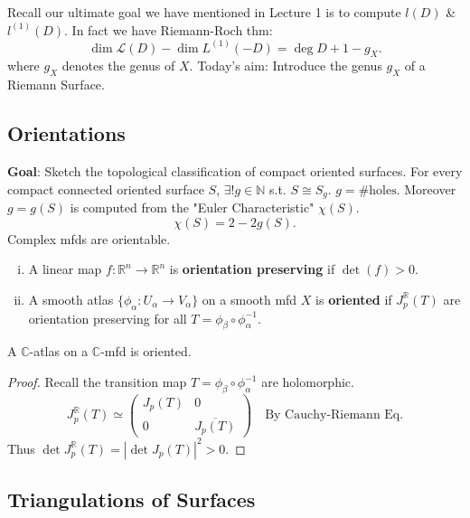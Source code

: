 \documentclass{article}
\begin{document}
Recall our ultimate goal we have mentioned in Lecture 1 is to compute $l(D)$ \& $l^{(1)}(D)$.
In fact we have Riemann-Roch thm:
\[
\dim \mathcal{L}(D) - \dim L^{(1)}(-D) = \deg D + 1 - g_X.
\]
where $g_X$ denotes the genus of $X$.
Today's aim: Introduce the genus $g_X$ of a Riemann Surface.

\subsection{Orientations}

\textbf{Goal}: Sketch the topological classification of compact oriented surfaces. For every compact connected oriented surface $S$, $\exists ! g \in \mathbb{N}$ s.t. $S \cong S_g$.
$g = \# \text{holes}$.
Moreover $g = g(S)$ is computed from the "Euler Characteristic" $\chi(S)$.
\[
\chi(S) = 2 - 2g(S).
\]
Complex mfds are orientable.
\begin{definition}
    \begin{enumerate}[(i)]
        \item A linear map $f: \mathbb{R}^n \to \mathbb{R}^n$ is \textbf{orientation preserving} if $\det(f) > 0$.
        \item A smooth atlas $\{ \phi_\alpha: U_\alpha \to V_\alpha \}$ on a smooth mfd $X$ is \textbf{oriented} if $J_p^{\mathbb{R}}(T)$ are orientation preserving for all $T = \phi_\beta \circ \phi_\alpha^{-1}$.
    \end{enumerate}
\end{definition}

\begin{proposition}
    A $\mathbb{C}$-atlas on a $\mathbb{C}$-mfd is oriented.
\end{proposition}
\begin{proof}
    Recall the transition map $T = \phi_\beta \circ \phi_\alpha^{-1}$ are holomorphic.
    \[
    J_p^{\mathbb{R}}(T) \simeq \begin{pmatrix} J_p(T) & 0 \\ 0 & \overline{J_p(T)} \end{pmatrix} \quad \text{By Cauchy-Riemann Eq.}
    \]
    Thus $\det J_p^{\mathbb{R}}(T) = |\det J_p(T)|^2 > 0$.
\end{proof}

\subsection{Triangulations of Surfaces}
\end{document}
